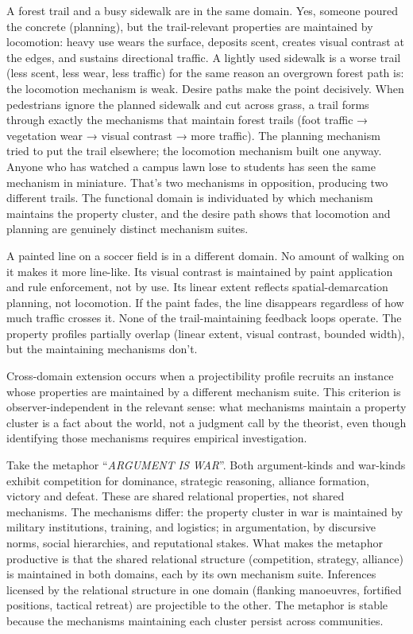 \documentclass[12pt]{article}
\newcommand{\metaphor}[1]{\enquote{\textit{\MakeUppercase{#1}}}}
\begin{document}
A forest trail and a busy sidewalk are in the same domain. Yes, someone poured the concrete (planning), but the trail-relevant properties are maintained by locomotion: heavy use wears the surface, deposits scent, creates visual contrast at the edges, and sustains directional traffic. A lightly used sidewalk is a worse trail (less scent, less wear, less traffic) for the same reason an overgrown forest path is: the locomotion mechanism is weak. Desire paths make the point decisively. When pedestrians ignore the planned sidewalk and cut across grass, a trail forms through exactly the mechanisms that maintain forest trails (foot traffic → vegetation wear → visual contrast → more traffic). The planning mechanism tried to put the trail elsewhere; the locomotion mechanism built one anyway. Anyone who has watched a campus lawn lose to students has seen the same mechanism in miniature. That's two mechanisms in opposition, producing two different trails. The functional domain is individuated by which mechanism maintains the property cluster, and the desire path shows that locomotion and planning are genuinely distinct mechanism suites.

A painted line on a soccer field is in a different domain. No amount of walking on it makes it more line-like. Its visual contrast is maintained by paint application and rule enforcement, not by use. Its linear extent reflects spatial-demarcation planning, not locomotion. If the paint fades, the line disappears regardless of how much traffic crosses it. None of the trail-maintaining feedback loops operate. The property profiles partially overlap (linear extent, visual contrast, bounded width), but the maintaining mechanisms don't.

Cross-domain extension occurs when a projectibility profile recruits an instance whose properties are maintained by a different mechanism suite. This criterion is observer-independent in the relevant sense: what mechanisms maintain a property cluster is a fact about the world, not a judgment call by the theorist, even though identifying those mechanisms requires empirical investigation.

Take the metaphor \metaphor{argument is war}. Both argument-kinds and war-kinds exhibit competition for dominance, strategic reasoning, alliance formation, victory and defeat. These are shared relational properties, not shared mechanisms. The mechanisms differ: the property cluster in war is maintained by military institutions, training, and logistics; in argumentation, by discursive norms, social hierarchies, and reputational stakes. What makes the metaphor productive is that the shared relational structure (competition, strategy, alliance) is maintained in both domains, each by its own mechanism suite. Inferences licensed by the relational structure in one domain (flanking manoeuvres, fortified positions, tactical retreat) are projectible to the other. The metaphor is stable because the mechanisms maintaining each cluster persist across communities.
\end{document}
